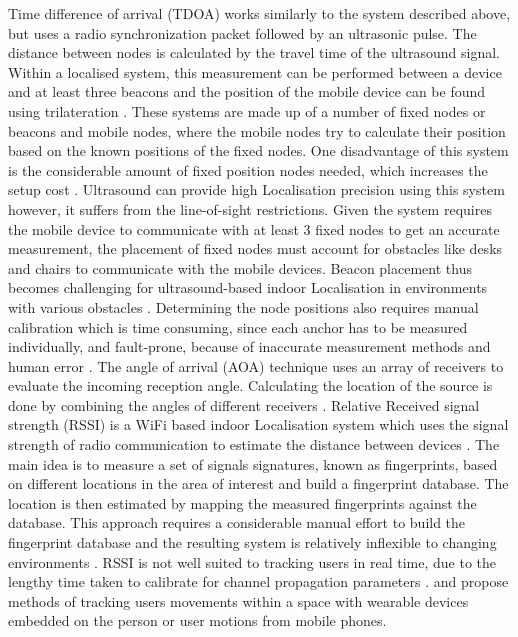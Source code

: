 \documentclass[]{final_report}
\begin{document}
Time difference of arrival (TDOA) works similarly to the system described above, but uses a radio synchronization packet followed by an ultrasonic pulse. The distance between nodes is calculated by the travel time of the ultrasound signal. Within a localised system, this measurement can be performed between a device and at least three beacons and the position of the mobile device can be found using trilateration \cite{piontek2007improving}. These systems are made up of a number of fixed nodes or beacons and mobile nodes, where the mobile nodes try to calculate their position based on the known positions of the fixed nodes.  
One disadvantage of this system is the considerable amount of fixed position nodes needed, which increases the setup cost \cite{segers2014ultrasonic}. Ultrasound can provide high Localisation precision using this system however, it suffers from the line-of-sight restrictions. Given the system requires the mobile device to communicate with at least 3 fixed nodes to get an accurate measurement, the placement of fixed nodes must account for obstacles like desks and chairs to communicate with the mobile devices. Beacon placement thus becomes challenging for ultrasound-based indoor Localisation in environments with various obstacles \cite{hsiao2008two}. Determining the node positions also requires manual calibration which is time consuming, since each anchor has to be measured individually, and fault-prone, because of inaccurate measurement methods and human error \cite{runge2011precise}.
The angle of arrival (AOA) technique uses an array of receivers to evaluate the incoming reception angle. Calculating the location of the source is done by combining the angles of different receivers \cite{segers2014ultrasonic}. 
Relative Received signal strength (RSSI) is a WiFi based indoor Localisation system which uses the signal strength of radio communication to estimate the distance between devices \cite{segers2014ultrasonic}. The main idea is to measure a set of signals signatures, known as fingerprints, based on different locations in the area of interest and build a fingerprint database. The location is then estimated by mapping the measured fingerprints against the database. This approach requires a considerable manual effort to build the fingerprint database and the resulting system is relatively inflexible to changing environments \cite{wu2013will}. RSSI is not well suited to tracking users in real time, due to the lengthy time taken to calibrate for channel propagation parameters \cite{ros2012indoor}.
\cite{huang2016wearable} and \cite{wu2013will} propose methods of tracking users movements within a space with wearable devices embedded on the person or user motions from mobile phones.
\end{document}
